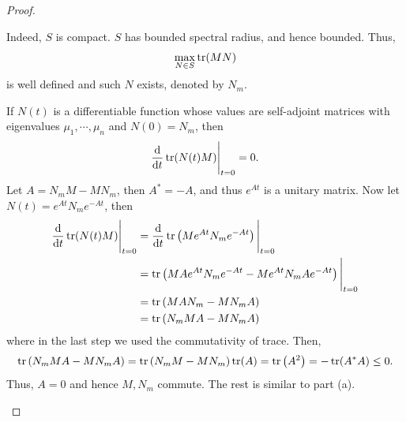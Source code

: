\documentclass[11pt]{book}
\theoremstyle{definition}
\numberwithin{equation}{chapter}
\begin{document}
\begin{proof}
\begin{enumerate}[label=(\alph*)]
    Indeed, $S$ is compact. $S$ has bounded spectral radius, and hence bounded. Thus, 
    $$\max_{N \in S} \tr (MN)$$ 
    is well defined and such $N$ exists, denoted by $N_m$. 
    
    If $N(t)$ is a differentiable function whose values are self-adjoint matrices with eigenvalues $\mu_1, \cdots, \mu_n$ and $N(0) = N_m$, then 
    \begin{align*}
        \dv{}{t} \tr (N(t)M)\Bigg|_{t=0} = 0.
    \end{align*}
    Let $A = N_m M - M N_m$, then $A^* = - A$, and thus $e^{At}$ is a unitary matrix. Now let $N(t) = e^{At} N_m e^{-At}$, then
    \begin{align*}
        \dv{}{t} \tr (N(t)M)\Bigg|_{t=0} & = \dv{}{t} \tr \left(M e^{At} N_m e^{-At} \right)\Bigg|_{t=0} \\
        & = \tr \left(M A e^{At} N_m e^{-At} - M e^{At} N_m A e^{-At} \right)\Bigg|_{t=0} \\
        & = \tr \left(M A N_m - M N_m A \right) \\
        & = \tr \left(N_m M A - M N_m A \right)
    \end{align*}
    where in the last step we used the commutativity of trace. Then, 
    \begin{align*}
        \tr \left(N_m M A - M N_m A \right) = \tr \left(N_m M - M N_m \right) \tr (A) = \tr \left(A^2 \right) = - \tr (A^*A) \leq 0.
    \end{align*}
    Thus, $A = 0$ and hence $M, N_m$ commute. The rest is similar to part (a).
\end{enumerate}
\end{proof}

\medskip
\end{document}
